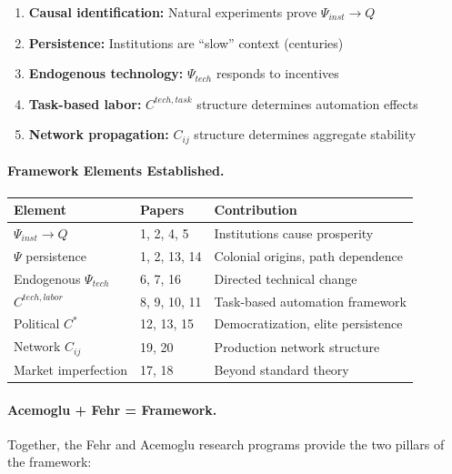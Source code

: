 \begin{enumerate}
  \item \textbf{Causal identification:} Natural experiments prove $\Psi_{inst} \to Q$
  \item \textbf{Persistence:} Institutions are ``slow'' context (centuries)
  \item \textbf{Endogenous technology:} $\Psi_{tech}$ responds to incentives
  \item \textbf{Task-based labor:} $C^{tech,task}$ structure determines automation effects
  \item \textbf{Network propagation:} $C_{ij}$ structure determines aggregate stability
\end{enumerate}

\paragraph{Framework Elements Established.}

\begin{center}
\renewcommand{\arraystretch}{1.2}
\small
\begin{tabular}{lll}
\hline
\textbf{Element} & \textbf{Papers} & \textbf{Contribution} \\
\hline
$\Psi_{inst} \to Q$ & 1, 2, 4, 5 & Institutions cause prosperity \\
$\Psi$ persistence & 1, 2, 13, 14 & Colonial origins, path dependence \\
Endogenous $\Psi_{tech}$ & 6, 7, 16 & Directed technical change \\
$C^{tech,labor}$ & 8, 9, 10, 11 & Task-based automation framework \\
Political $C^*$ & 12, 13, 15 & Democratization, elite persistence \\
Network $C_{ij}$ & 19, 20 & Production network structure \\
Market imperfection & 17, 18 & Beyond standard theory \\
\hline
\end{tabular}
\end{center}

\paragraph{Acemoglu + Fehr = Framework.}
Together, the Fehr and Acemoglu research programs provide the two pillars
of the framework:

